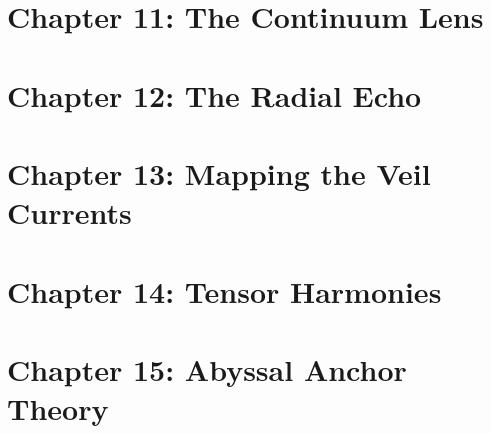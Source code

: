 
\chapter{Chapter 11: The Continuum Lens}

\chapter{Chapter 12: The Radial Echo}

\chapter{Chapter 13: Mapping the Veil Currents}

\chapter{Chapter 14: Tensor Harmonies}

\chapter{Chapter 15: Abyssal Anchor Theory}
